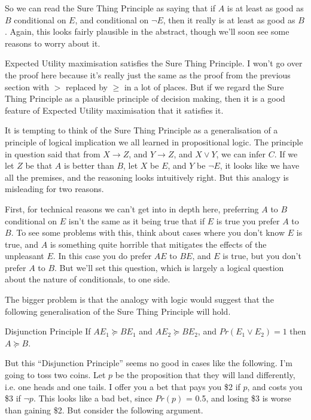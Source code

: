 So we can read the Sure Thing Principle as saying that if $A$ is at least as good as $B$ conditional on $E$, and conditional on $\neg E$, then it really is at least as good as $B$. Again, this looks fairly plausible in the abstract, though we'll soon see some reasons to worry about it.

Expected Utility maximisation satisfies the Sure Thing Principle. I won't go over the proof here because it's really just the same as the proof from the previous section with $>$ replaced by $\geq$ in a lot of places. But if we regard the Sure Thing Principle as a plausible principle of decision making, then it is a good feature of Expected Utility maximisation that it satisfies it.

It is tempting to think of the Sure Thing Principle as a generalisation of a principle of logical implication we all learned in propositional logic. The principle in question said that from $X \rightarrow Z$, and $Y \rightarrow Z$, and $X \vee Y$, we can infer $C$. If we let $Z$ be that $A$ is better than $B$, let $X$ be $E$, and $Y$ be $\neg E$, it looks like we have all the premises, and the reasoning looks intuitively right. But this analogy is misleading for two reasons.

First, for technical reasons we can't get into in depth here, preferring $A$ to $B$ conditional on $E$ isn't the same as it being true that if $E$ is true you prefer $A$ to $B$. To see some problems with this, think about cases where you don't know $E$ is true, and $A$ is something quite horrible that mitigates the effects of the unpleasant $E$. In this case you do prefer $AE$ to $BE$, and $E$ is true, but you don't prefer $A$ to $B$. But we'll set this question, which is largely a logical question about the nature of conditionals, to one side.

The bigger problem is that the analogy with logic would suggest that the following generalisation of the Sure Thing Principle will hold.
\begin{description*}
\item[Disjunction Principle] If $AE_1 \succeq BE_1$ and $AE_2 \succeq BE_2$, and $Pr(E_1 \vee E_2) = 1$ then $A \succeq B$.
\end{description*}
But this ``Disjunction Principle'' seems no good in cases like the following. I'm going to toss two coins. Let $p$ be the proposition that they will land differently, i.e. one heads and one tails. I offer you a bet that pays you \$2 if $p$, and costs you \$3 if $\neg p$. This looks like a bad bet, since $Pr(p)$ = 0.5, and losing \$3 is worse than gaining \$2. But consider the following argument.

